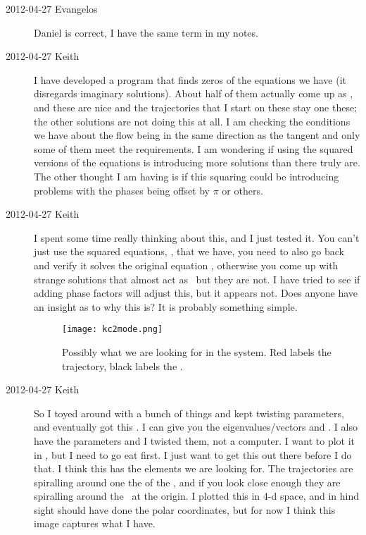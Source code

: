 \begin{description}
\item[2012-04-27 Evangelos] Daniel is correct, I have the same term in my notes.

\item[2012-04-27 Keith]  I have developed a program that finds zeros of
the equations we have (it disregards imaginary solutions).  About half of
them actually come up as \reqva, and these are nice and
the trajectories that I start on these stay one these; the other
solutions are not doing this at all.  I am checking the conditions we
have about the flow being in the same direction as the tangent and only
some of them meet the requirements.  I am wondering if using the squared
versions of the equations is introducing more solutions than there truly
are.  The other thought I am having is if this squaring could be
introducing problems with the phases being offset by $\pi$ or others.


\item[2012-04-27 Keith]  I spent some time really thinking about this,
and I just tested it.  You can't just use the squared equations,
, that we have, you need to also go back and verify
it solves the original equation , otherwise you
come up with strange solutions that almost act as \reqva\
but they are not.  I have tried to see if adding phase factors will
adjust this, but it appears not.  Does anyone have an insight as to why
this is?  It is probably something simple.

 \begin{figure}[h]
\centering
  \texttt{[image: kc2mode.png]}
\caption{
Possibly what we are looking for in the {\twoMode} system.  Red labels the
trajectory, black labels the \reqv.}
 \label{fig:2modeproblem}
\end{figure}

\item[2012-04-27 Keith] So I toyed around with a bunch of things and kept
twisting parameters, and eventually got this \reffig{fig:2modeproblem}.
I can give you the eigenvalues/vectors and \reqv.  I
also have the parameters and I twisted them, not a computer.  I want to
plot it in \reducedsp, but I need to go eat first.  I just want to get
this out there before I do that.  I think this has the elements we are
looking for.  The trajectories are spiralling around one the of the
\reqva, and if you look close enough they are spiralling
around the \eqv\ at the origin.  I plotted this in 4-d space, and
in hind sight should have done the polar coordinates, but for now I think
this image captures what I have.



\end{description}
